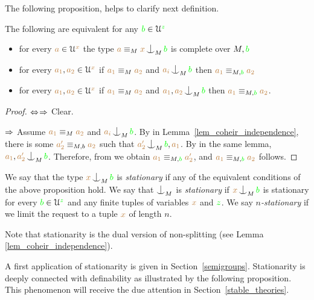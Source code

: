 The following proposition, helps to clarify next definition.

\begin{proposition}
  The following are equivalent for any ${\color{green} b}\in\EuScript U^{\color{green} z}$
  \begin{itemize}
    \item [1.] for every ${\color{brown} a}\in\EuScript U^{\color{brown} x}$ the type ${\mr a}\equiv_M{\mr x}\nonfork_M{\gr b}$ is complete over $M,{\color{green} b}$
    \item [2.] for every ${\color{brown} a_1},{\color{brown} a_2}\in\EuScript U^{\color{brown} x}$ if ${\color{brown} a_1}\equiv_M{\color{brown} a_2}$ and ${\mr a_i}\nonfork_M{\gr b}$ then ${\color{brown} a_1}\equiv_{M,{\color{green} b}}{\color{brown} a_2}$  \item [3.] for every ${\color{brown} a_1},{\color{brown} a_2}\in\EuScript U^{\color{brown} x}$ if ${\color{brown} a_1}\equiv_M{\color{brown} a_2}$ and ${\mr a_1},{\mr a_2}\nonfork_M{\gr b}$ then ${\color{brown} a_1}\equiv_{M,{\color{green} b}}{\color{brown} a_2}$.    
  \end{itemize}
\end{proposition}

\begin{proof}
  $\Leftrightarrow$$\Rightarrow$ Clear.

  $\Rightarrow$ Assume ${\color{brown} a_1}\equiv_M{\color{brown} a_2}$ and ${\mr a_i}\nonfork_M{\gr b}$. 
  By  in Lemma~\ref{lem_coheir_independence}, there is some ${\color{brown} a'_2}\equiv_{M,b}{\color{brown} a_2}$ such that ${\mr a'_2}\nonfork_M{\gr b},{\mr a_1}$.
  By  in the same lemma,  ${\mr a_1},{\mr a'_2}\nonfork_M{\gr b}$.
  Therefore, from  we obtain ${\color{brown} a_1}\equiv_{M,{\color{green} b}}{\color{brown} a'_2}$, and ${\color{brown} a_1}\equiv_{M,{\color{green} b}}{\color{brown} a_2}$ follows.
\end{proof}

\begin{definition}\label{def_coheir_stationary} 
  We say that the type ${\mr x}\nonfork_M{\gr b}$ is \emph{stationary\/} if any of the equivalent conditions of the above proposition hold.
  We say that $\nonfork_M$ is \emph{stationary\/} if ${\mr x}\nonfork_M{\gr b}$ is stationary for every ${\color{green} b}\in\EuScript U^{\color{green} z}$ and any finite tuples of variables ${\color{brown} x}$ and ${\color{green} z}$.
  We say \emph{$n$-stationary\/} if we limit the request to a tuple ${\color{brown} x}$ of length $n$.
\end{definition}

Note that stationarity is the dual version of non-splitting (see Lemma~
\ref{lem_coheir_independence}).

A first application of stationarity is given in Section~\ref{semigroups}.
Stationarity is deeply connected with definability as illustrated by the following proposition.
This phenomenon will receive the due attention in Section~\ref{stable_theories}.

